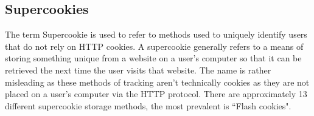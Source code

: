 \documentclass{article}
\begin{document}
\subsection{Supercookies} \label{Supercookies}
The term Supercookie is used to refer to methods used to uniquely identify users that do not rely on HTTP cookies. A supercookie generally refers to a means of storing something unique from a website on a user's computer so that it can be retrieved the next time the user visits that website. The name is rather misleading as these methods of tracking aren't technically cookies as they are not placed on a user's computer via the HTTP protocol. There are approximately 13 different supercookie storage methods, the most prevalent is ``Flash cookies". \newline 
\end{document}

